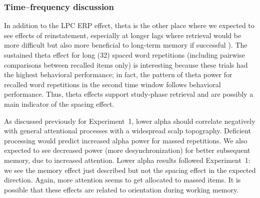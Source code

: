 \subsubsection{Time--frequency discussion}


In addition to the LPC ERP effect, theta is the other place where we expected to see effects of reinstatement,
especially at longer lags where retrieval would be more difficult but also more beneficial to long-term memory if successful
\cite{DelaEtal2010,PavlAnde2005}).
The sustained theta effect for long (32) spaced word repetitions (including pairwise comparisons between recalled items only) is interesting because these trials had the highest behavioral performance; in fact, the pattern of theta power for recalled word repetitions in the second time window follows behavioral performance.  Thus, theta effects support study-phase retrieval and are possibly a main indicator of the spacing effect.



As discussed previously for Experiment~1, lower alpha should correlate negatively with general attentional processes with a widespread scalp topography.  Deficient processing would predict increased alpha power for massed repetitions.  We also expected to see decreased power (more desynchronization) for better subsequent memory, due to increased attention.
Lower alpha results followed Experiment~1: we see the memory effect just described but not the spacing effect in the expected direction.  Again, more attention seems to get allocated to massed items.  It is possible that these effects are related to orientation during working memory.


